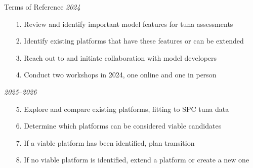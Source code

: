 \documentclass[aspectratio=169]{beamer}
\begin{document}
\begin{frame}{Terms of Reference}\small
  \textit{2024}
  \begin{itemize}
    \item[1.] Review and identify important model features for tuna
    assessments\\[-1ex]
    \item[2.] Identify existing platforms that have these features or can be
    extended\\[-1ex]
    \item[3.] Reach out to and initiate collaboration with model
    developers\\[-1ex]
    \item[4.] Conduct two workshops in 2024, one online and one in person\\[4ex]
  \end{itemize}
  \textit{2025--2026}
  \begin{itemize}
    \item[5.] Explore and compare existing platforms, fitting to SPC tuna
    data\\[-1ex]
    \item[6.] Determine which platforms can be considered viable
    candidates\\[-1ex]
    \item[7.] If a viable platform has been identified, plan transition\\[-1ex]
    \item[8.] If no viable platform is identified, extend a platform or create a
    new one
  \end{itemize}
\end{frame}

\end{document}
